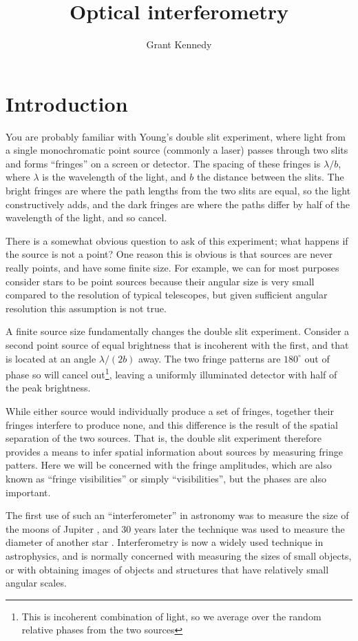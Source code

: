 \documentclass[11pt]{article}
\title{Optical interferometry}
\author{Grant Kennedy}
\begin{document}
\maketitle

\section{Introduction}

You are probably familiar with Young's double slit experiment, where light from a single monochromatic point source (commonly a laser) passes through two slits and forms ``fringes'' on a screen or detector. The spacing of these fringes is $\lambda/b$, where $\lambda$ is the wavelength of the light, and $b$ the distance between the slits. The bright fringes are where the path lengths from the two slits are equal, so the light constructively adds, and the dark fringes are where the paths differ by half of the wavelength of the light, and so cancel.

There is a somewhat obvious question to ask of this experiment; what happens if the source is not a point? One reason this is obvious is that sources are never really points, and have some finite size. For example, we can for most purposes consider stars to be point sources because their angular size is very small compared to the resolution of typical telescopes, but given sufficient angular resolution this assumption is not true.

A finite source size fundamentally changes the double slit experiment. Consider a second point source of equal brightness that is incoherent with the first, and that is located at an angle $\lambda/(2b)$ away. The two fringe patterns are $180^\circ$ out of phase so will cancel out\footnote{This is incoherent combination of light, so we average over the random relative phases from the two sources}, leaving a uniformly illuminated detector with half of the peak brightness.

While either source would individually produce a set of fringes, together their fringes interfere to produce none, and this difference is the result of the spatial separation of the two sources. That is, the double slit experiment therefore provides a means to infer spatial information about sources by measuring fringe patters. Here we will be concerned with the fringe amplitudes, which are also known as ``fringe visibilities'' or simply ``visibilities'', but the phases are also important.

The first use of such an ``interferometer'' in astronomy was to measure the size of the moons of Jupiter \citep{1891PASP....3..274M,1891Natur..45..160M}, and 30 years later the technique was used to measure the diameter of another star \citep{1921ApJ....53..249M}. Interferometry is now a widely used technique in astrophysics, and is normally concerned with measuring the sizes of small objects, or with obtaining images of objects and structures that have relatively small angular scales.
\end{document}
